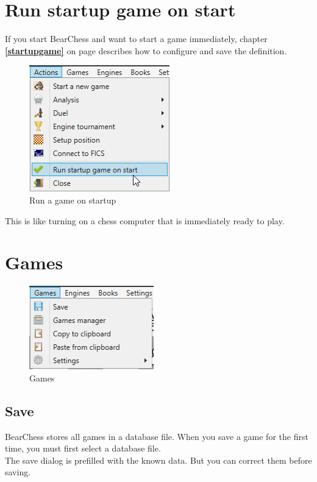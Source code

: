 \documentclass[11pt,a4paper]{article}
\begin{document}
\section{Run startup game on start} \label{runstartupgame}

If you start BearChess and want to start a game immediately, chapter \textbf{\ref{startupgame}  } on page \pageref{startupgame} describes how to configure and save the definition.

\begin{figure}[H]
	\centering
	\includegraphics[scale=1.0]{runonstartup.png}
	\caption{Run a game on startup}
	\label{fig:RunOnStartup1}
\end{figure}

This is like turning on a chess computer that is immediately ready to play.



\section{Games} \label{games}

\begin{figure}[H]
	\centering
	\includegraphics[scale=1.0]{Games1.png}
	\caption{Games}
	\label{fig:Games1}
\end{figure}

\subsection{Save}

BearChess stores all games in a database file. When you save a game for the first time, you must first select a database file.\\
The save dialog is prefilled with the known data. But you can correct them before saving.
\end{document}
